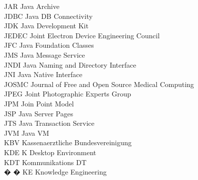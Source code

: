 \begin{tabbing}
    \>JAR \>\>Java Archive\\

    \>JDBC \>\>Java DB Connectivity\\

    \>JDK \>\>Java Development Kit\\

    \>JEDEC \>\>Joint Electron Device Engineering Council\\

    \>JFC \>\>Java Foundation Classes\\

    \>JMS \>\>Java Message Service\\

    \>JNDI \>\>Java Naming and Directory Interface\\

    \>JNI \>\>Java Native Interface\\

    \>JOSMC \>\>Journal of Free and Open Source Medical Computing\\


    \>JPEG \>\>Joint Photographic Experts Group\\

    \>JPM \>\>Join Point Model\\


    \>JSP \>\>Java Server Pages\\


    \>JTS \>\>Java Transaction Service\\

    \>JVM \>\>Java VM\\

    \>KBV \>\>Kassenaerztliche Bundesvereinigung\\

    \>KDE \>\>K Desktop Environment\\

    \>KDT \>\>Kommunikations DT\\

� � \>KE \>\>Knowledge Engineering\\



\end{tabbing}
